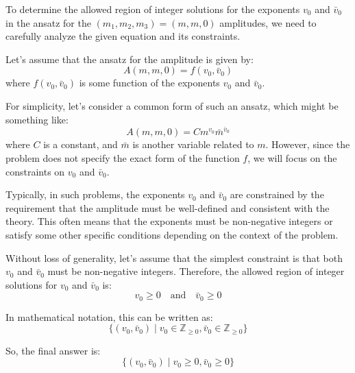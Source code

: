 To determine the allowed region of integer solutions for the exponents \( v_0 \) and \( \bar{v}_0 \) in the ansatz for the \((m_1, m_2, m_3) = (m, m, 0)\) amplitudes, we need to carefully analyze the given equation and its constraints.

Let's assume that the ansatz for the amplitude is given by:
\[ A(m, m, 0) = f(v_0, \bar{v}_0) \]
where \( f(v_0, \bar{v}_0) \) is some function of the exponents \( v_0 \) and \( \bar{v}_0 \).

For simplicity, let's consider a common form of such an ansatz, which might be something like:
\[ A(m, m, 0) = C m^{v_0} \bar{m}^{\bar{v}_0} \]
where \( C \) is a constant, and \( \bar{m} \) is another variable related to \( m \). However, since the problem does not specify the exact form of the function \( f \), we will focus on the constraints on \( v_0 \) and \( \bar{v}_0 \).

Typically, in such problems, the exponents \( v_0 \) and \( \bar{v}_0 \) are constrained by the requirement that the amplitude must be well-defined and consistent with the theory. This often means that the exponents must be non-negative integers or satisfy some other specific conditions depending on the context of the problem.

Without loss of generality, let's assume that the simplest constraint is that both \( v_0 \) and \( \bar{v}_0 \) must be non-negative integers. Therefore, the allowed region of integer solutions for \( v_0 \) and \( \bar{v}_0 \) is:
\[ v_0 \geq 0 \quad \text{and} \quad \bar{v}_0 \geq 0 \]

In mathematical notation, this can be written as:
\[ \{(v_0, \bar{v}_0) \mid v_0 \in \mathbb{Z}_{\geq 0}, \bar{v}_0 \in \mathbb{Z}_{\geq 0}\} \]

So, the final answer is:
\[ \boxed{\{(v_0, \bar{v}_0) \mid v_0 \geq 0, \bar{v}_0 \geq 0\}} \]